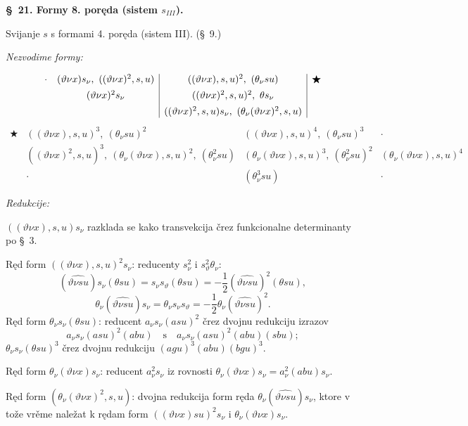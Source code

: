 \documentclass[11pt]{article}
\begin{document}
\begin{center}
\textbf{\S\ 21. \quad Formy 8. poręda (sistem $s_{III}$).}
\end{center}

Svijanje $s$ s formami 4. poręda (sistem III). (\S\ 9.)

\noindent\textit{Nezvodime formy:}

\[
\begin{array}{c@{\quad}c|c|c}
\cdot
& (\vartheta\nu x)s_{\nu},\ ((\vartheta\nu x)^2,s,u)
& ((\vartheta\nu x),s,u)^2,\ (\theta_{\nu}su)
& \bigstar\\[0.45em]
& (\vartheta\nu x)^2s_{\nu}
& ((\vartheta\nu x)^2,s,u)^2,\ \theta s_{\nu}
& \\[0.45em]
&& ((\vartheta\nu x)^2,s,u)s_{\nu},\ (\theta_{\nu}(\vartheta\nu x)^2,s,u)
&
\end{array}
\]
\[
\begin{array}{c|c|c|c}
\bigstar
& ((\vartheta\nu x),s,u)^3,\ (\theta_{\nu}su)^2
& ((\vartheta\nu x),s,u)^4,\ (\theta_{\nu}su)^3
& \cdot\\[0.45em]
& ((\vartheta\nu x)^2,s,u)^3,\ (\theta_{\nu}(\vartheta\nu x),s,u)^2,\ (\theta_{\nu}^2su)
& (\theta_{\nu}(\vartheta\nu x),s,u)^3,\ (\theta_{\nu}^2su)^2
& (\theta_{\nu}(\vartheta\nu x),s,u)^4\\[0.45em]
& \cdot
& (\theta_{\nu}^3su)
& \cdot
\end{array}
\]

\noindent\textit{Redukcije:}

$((\vartheta\nu x),s,u)s_{\nu}$ razklada se kako transvekcija črez funkcionalne determinanty po \S\ 3.

Ręd form $((\vartheta\nu x),s,u)^2s_{\nu}$: reducenty $s_{\nu}^2$ i $s_\vartheta^2\theta_{\nu}$:
\[
(\widehat{\vartheta\nu su})s_{\nu}(\theta su)=s_{\nu}s_\vartheta(\theta su)=-\frac12(\widehat{\vartheta\nu su})^2(\theta su),
\]
\[
\theta_{\nu}(\widehat{\vartheta\nu su})s_{\nu}=\theta_{\nu}s_{\nu}s_\vartheta=-\frac12\theta_{\nu}(\widehat{\vartheta\nu su})^2.
\]
Ręd form $\theta_{\nu}s_{\nu}(\theta su)$: reducent $a_{\nu}s_{\nu}(asu)^2$ črez dvojnu redukciju izrazov
\[
a_{\nu}s_{\nu}(asu)^2(abu)\quad\text{s}\quad a_{\nu}s_{\nu}(asu)^2(abu)(sbu);
\]
$\theta_{\nu}s_{\nu}(\theta su)^3$ črez dvojnu redukciju $(agu)^3(abu)(bgu)^3$.

Ręd form $\theta_{\nu}(\vartheta\nu x)s_{\nu}$: reducent $a_{\nu}^2s_{\nu}$ iz rovnosti $\theta_{\nu}(\vartheta\nu x)s_{\nu}=a_{\nu}^2(abu)s_{\nu}$.

Ręd form $(\theta_{\nu}(\vartheta\nu x)^2,s,u)$: dvojna redukcija form ręda $\theta_{\nu}(\widehat{\vartheta\nu su})s_{\nu}$, ktore v tože vrěme naležat k rędam form $((\vartheta\nu x)su)^2s_{\nu}$ i $\theta_{\nu}(\vartheta\nu x)s_{\nu}$.
\end{document}
